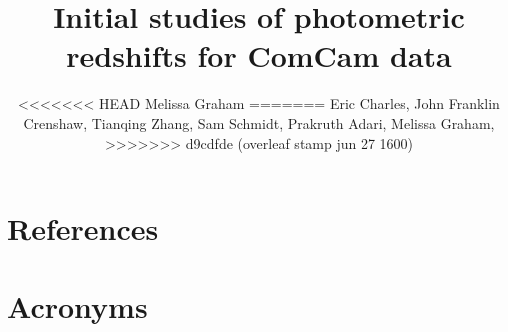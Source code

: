 \documentclass[SE,lsstdraft,authoryear,toc]{lsstdoc}
\title{Initial studies of photometric redshifts for ComCam data}
\author{%
<<<<<<< HEAD
Melissa Graham
=======
  Eric Charles,
  John Franklin Crenshaw,
  Tianqing Zhang, 
  Sam Schmidt,
  Prakruth Adari, 
  Melissa Graham,  
>>>>>>> d9cdfde (overleaf stamp jun 27 1600)
}
\date{\vcsDate}
\begin{document}
\maketitle


\appendix




\section{References} \label{sec:bib}
\renewcommand{\refname}{} %


\section{Acronyms} \label{sec:acronyms}

\end{document}
